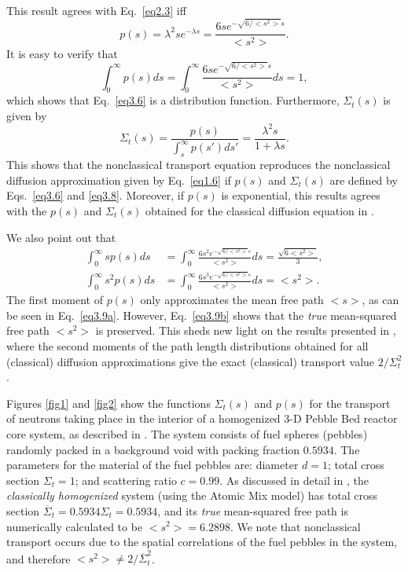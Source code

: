 \documentclass[preprint,12pt]{elsarticle}
\newcommand{\bl}{\big<}
\newcommand{\bg}{\big>}
\begin{document}
This result agrees with Eq.\ \eqref{eq2.3} iff
\begin{equation}
\label{eq3.6}
p(s) = \lambda^2se^{-\lambda s}=\frac{6se^{-\sqrt{6/<s^2>}s}}{\bl s^2\bg}.
\end{equation}
It is easy to verify that
\begin{equation}\label{eq3.7}
\int_0^\infty p(s)ds = \int_0^\infty \frac{6se^{-\sqrt{6/<s^2>}s}}{\bl s^2\bg} ds = 1,
\end{equation}
which shows that Eq.\ \eqref{eq3.6} is a distribution function. Furthermore, $\Sigma_t(s)$ is given by
\begin{equation}
\label{eq3.8}
\Sigma_t(s) = \frac{p(s)}{\int_s^\infty p(s')ds'} = \frac{\lambda^2 s}{1+\lambda s}.
\end{equation}
This shows that the nonclassical transport equation reproduces the nonclassical diffusion approximation given by Eq.\ \eqref{eq1.6} if $p(s)$ and $\Sigma_t(s)$ are defined by Eqs.\ \eqref{eq3.6} and \eqref{eq3.8}. Moreover, if $p(s)$ is exponential, this results agrees with the $p(s)$ and $\Sigma_t(s)$ obtained for the classical diffusion equation in \cite{siap15}.  

We also point out that
\begin{subequations}\label{eq3.9}
\begin{align}
\int_0^\infty sp(s)ds &=\int_0^\infty \frac{6s^2e^{-\sqrt{6/<s^2>}s}}{\bl s^2\bg} ds = \frac{\sqrt{6\bl s^2\bg}}{3},\label{eq3.9a}\\
\int_0^\infty s^2p(s)ds &=\int_0^\infty \frac{6s^3e^{-\sqrt{6/<s^2>}s}}{\bl s^2\bg} ds = \bl s^2\bg\label{eq3.9b}.
\end{align}
\end{subequations}
The first moment of $p(s)$ only approximates the mean free path $\bl s \bg$, as can be seen in Eq.\ \eqref{eq3.9a}. However, Eq.\ \eqref{eq3.9b} shows that the \textit{true} mean-squared free path $\bl s^2\bg$ is preserved. This sheds new light on the results presented in \cite{siap15}, where the second moments of the path length distributions obtained for all (classical) diffusion approximations give the exact (classical) transport value $2/\Sigma_t^2$.

Figures \ref{fig1} and \ref{fig2} show the functions $\Sigma_t(s)$ and $p(s)$ for the transport of neutrons taking place in the interior of a homogenized 3-D Pebble Bed reactor core system, as described in \cite{vasques_14b}. The system consists of fuel spheres (pebbles) randomly packed in a background void with packing fraction $0.5934$. The parameters for the material of the fuel pebbles are: diameter $d=1$; total cross section $\Sigma_t=1$; and scattering ratio $c=0.99$. As discussed in detail in \cite{vasques_14b}, the \textit{classically homogenized} system (using the Atomic Mix model) has total cross section $\overline \Sigma_t  = 0.5934\Sigma_t = 0.5934$, and its \textit{true} mean-squared free path is numerically calculated to be $\bl s^2 \bg = 6.2898$. We note that nonclassical transport occurs due to the spatial correlations of the fuel pebbles in the system, and therefore $\bl s^2 \bg \neq 2/\overline\Sigma_t^2$.
\end{document}
